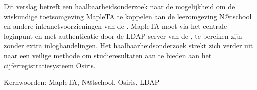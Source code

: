 \samenvatting

Dit verslag betreft een haalbaarheidsonderzoek naar de mogelijkheid om
de wiskundige toetsomgeving MapleTA te koppelen aan de leeromgeving
N@tschool en andere intranetvoorzieningen van de \HR{}. MapleTA moet
via het centrale loginpunt en met authenticatie door de LDAP-server
van de \HR{}, te bereiken zijn zonder extra inloghandelingen. Het
haalbaarheidsonderzoek strekt zich verder uit naar een veilige methode
om studieresultaten aan te bieden aan het cijferregistratiesysteem
Osiris.

Kernwoorden: MapleTA, N@tschool, Osiris, LDAP
